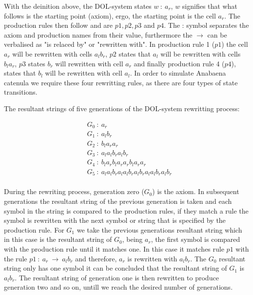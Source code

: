 \begin{flushleft}
\vspace{5mm}

With the deinition above, the DOL-system states $w~ :~ a_r$, $w$ signifies that what follows is the starting point (axiom), ergo, the starting point is the cell $a_r$. The production rules then follow and are $p1, p2, p3$ and $p4$. The : symbol separates the axiom and production names from their value, furthermore the $\rightarrow$ can be verbalised as "is relaced by" or "rewritten with". In production rule 1 ($p1$) the cell $a_r$ will be rewritten with cells $a_l b_r$, $p2$ states that $a_l$ will be rewritten with cells $b_l a_r$, $p3$ states $b_r$ will rewritten with cell $a_r$ and finally production rule 4 ($p4$), states that $b_l$ will be rewritten with cell $a_l$. In order to simulate Anabaena catenula we require these four rewritting rules, as there are four types of state transitions. \\

\vspace{5mm}

The resultant strings of five generations of the DOL-system rewritting process: \\

\vspace{5mm}

\begin{equation} \label{DOL-system result string}
\begin{aligned}
	& G_0~ :~ a_r \\
	& G_1~ :~ a_l b_r \\
	& G_2~ :~ b_l a_r a_r \\
	& G_3~ :~ a_l a_l b_r a_l b_r \\
	& G_4~ :~ b_l a_r b_l a_r a_r b_l a_r a_r \\
	& G_5~ :~ a_l a_l b_r a_l a_l b_r a_l b_r a_l a_l b_r a_l b_r \\
\end{aligned}
\end{equation}

\vspace{5mm}

During the rewriting process, generation zero ($G_0$) is the axiom. In subsequent generations the resultant string of the previous generation is taken and each symbol in the string is compared to the production rules, if they match a rule the symbol is rewritten with the next symbol or string that is specified by the production rule. For $G_1$ we take the previous generations resultant string which in this case is the resultant string of $G_0$, being $a_r$, the first symbol is compared with the production rule until it matches one. In this case it matches rule $p1$ with the rule $p1~ :~ a_r~ \rightarrow~ a_l b_r$ and therefore, $a_r$ is rewritten with $a_l b_r$. The $G_0$ resultant string only has one symbol it can be concluded that the resultant string of $G_1$ is $a_l b_r$. The resultant string of generation one is then rewritten to produce generation two and so on, untill we reach the desired number of generations.\\

\vspace{5mm}

\end{flushleft}

